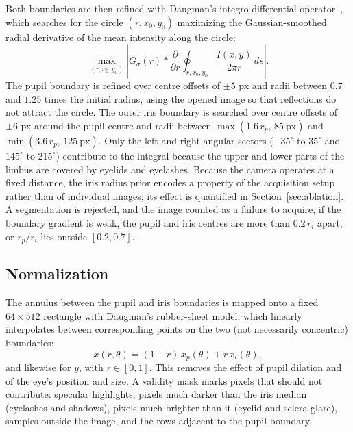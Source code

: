 \documentclass[conference]{IEEEtran}
\begin{document}
Both boundaries are then refined with Daugman's integro-differential operator~\cite{daugman2004}, which searches for the circle $(r,x_0,y_0)$ maximizing the Gaussian-smoothed radial derivative of the mean intensity along the circle:
\begin{equation}
\max_{(r,x_0,y_0)}\left| G_\sigma(r) * \frac{\partial}{\partial r}\oint_{r,x_0,y_0}\frac{I(x,y)}{2\pi r}\,ds \right|.
\label{eq:daugman}
\end{equation}
The pupil boundary is refined over centre offsets of $\pm5$ px and radii between $0.7$ and $1.25$ times the initial radius, using the opened image so that reflections do not attract the circle. The outer iris boundary is searched over centre offsets of $\pm6$ px around the pupil centre and radii between $\max(1.6\,r_p,\,85\ \text{px})$ and $\min(3.6\,r_p,\,125\ \text{px})$. Only the left and right angular sectors ($-35^\circ$ to $35^\circ$ and $145^\circ$ to $215^\circ$) contribute to the integral because the upper and lower parts of the limbus are covered by eyelids and eyelashes. Because the camera operates at a fixed distance, the iris radius prior encodes a property of the acquisition setup rather than of individual images; its effect is quantified in Section~\ref{sec:ablation}. A segmentation is rejected, and the image counted as a failure to acquire, if the boundary gradient is weak, the pupil and iris centres are more than $0.2\,r_i$ apart, or $r_p/r_i$ lies outside $[0.2,0.7]$.

\subsection{Normalization}
The annulus between the pupil and iris boundaries is mapped onto a fixed $64\times512$ rectangle with Daugman's rubber-sheet model, which linearly interpolates between corresponding points on the two (not necessarily concentric) boundaries:
\begin{equation}
x(r,\theta)=(1-r)\,x_p(\theta)+r\,x_i(\theta),
\label{eq:rubber}
\end{equation}
and likewise for $y$, with $r\in[0,1]$. This removes the effect of pupil dilation and of the eye's position and size. A validity mask marks pixels that should not contribute: specular highlights, pixels much darker than the iris median (eyelashes and shadows), pixels much brighter than it (eyelid and sclera glare), samples outside the image, and the rows adjacent to the pupil boundary.
\end{document}
